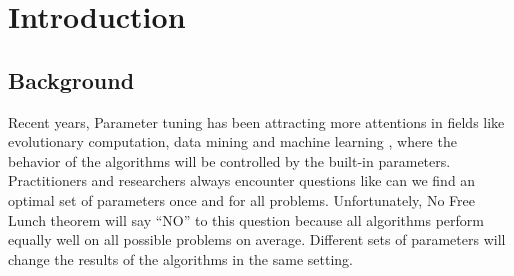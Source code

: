 \section{Introduction}

\subsection{Background}
Recent years, Parameter tuning has been attracting more attentions in fields like evolutionary
computation, data mining and  machine learning \cite{lobo2007parameter,Bergstra2012}, where the behavior of the algorithms will be controlled by the built-in parameters.  Practitioners and researchers always encounter questions like can we find an optimal set of parameters once and for all problems. Unfortunately, No Free Lunch theorem \cite{wolpert1997no} will say “NO” to this question because all algorithms perform equally well on all possible problems on average. Different sets of parameters will change the results of the algorithms in the same setting.

